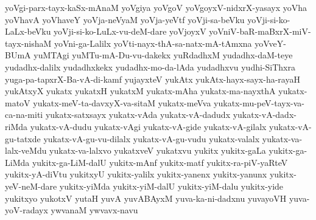 {yoVgi-parx-tayx-kaSx-mAnaM
yoVgiya
yoVgoV
yoVgoyxV-nidxrX-yasayx
yoVha
yoVhavA
yoVhaveY
yoVja-neVyaM
yoVja-yeVtf
yoVji-sa-beVku
yoVji-si-ko-LaLx-beVku
yoVji-si-ko-LuLx-vu-deM-dare
yoVjoyxV
yoVniV-baR-maBxrX-miV-tayx-nishaM
yoVni-ga-Lalilx
yoVti-nayx-thA-sa-natx-mA-tAmxna
yoVveY-BUmA
yuMTAgi
yuMTu-mA-Du-vu-dakekx
yuRdadhxM
yudadhx-daM-teye
yudadhx-dalilx
yudadhxkekx
yudadhx-mo-da-lAda
yudadhxvu
yudhi-SiThxra
yuga-pa-tapxrX-Ba-vA-di-kamf
yujayxteV
yukAtx
yukAtx-hayx-sayx-ha-rayaH
yukAtxyX
yukatx
yukatxH
yukatxM
yukatx-mAha
yukatx-ma-nayxthA
yukatx-matoV
yukatx-meV-ta-davxyX-va-sitaM
yukatx-meVva
yukatx-mu-peV-tayx-va-ca-na-miti
yukatx-satxsayx
yukatx-vAda
yukatx-vA-dadudx
yukatx-vA-dadx-riMda
yukatx-vA-dudu
yukatx-vAgi
yukatx-vA-gide
yukatx-vA-gilalx
yukatx-vA-gu-tatxde
yukatx-vA-gu-vu-dilalx
yukatx-vA-gu-vudu
yukatx-valalx
yukatx-va-lalx-veMdu
yukatx-va-lalxvo
yukatxveV
yukatxvu
yukitx
yukitx-gaLa
yukitx-ga-LiMda
yukitx-ga-LiM-dalU
yukitx-mAnf
yukitx-matf
yukitx-ra-piV-yaRteV
yukitx-yA-diVtu
yukitxyU
yukitx-yalilx
yukitx-yanenx
yukitx-yanunx
yukitx-yeV-neM-dare
yukitx-yiMda
yukitx-yiM-dalU
yukitx-yiM-dalu
yukitx-yide
yukitxyo
yukotxV
yutaH
yuvA
yuvABAyxM
yuva-ka-ni-dadxnu
yuvayoVH
yuva-yoV-radayx
ywvanaM
ywvavx-navu
}
